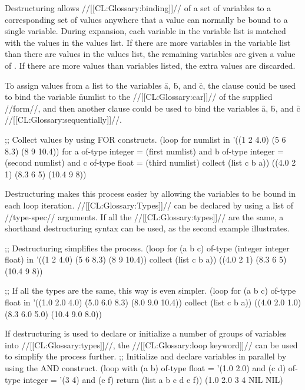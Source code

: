 \endlist
 
Destructuring allows //[[CL:Glossary:binding]]// of a set of variables to a corresponding
set of values anywhere that a value can normally be bound to a single
variable.  During  expansion, 
each variable in the variable list
is matched with the values in the values list.  If there are more variables
in the variable list than there are values in the values list, the 
remaining variables are given a value of \nil.  If there are more
values than variables listed, the extra values are discarded.

 
To assign values from a list to the variables \f{a},
\f{b}, and \f{c}, the  clause could be used to
bind the variable \f{numlist} to the 
//[[CL:Glossary:car]]// of the supplied //form//,
and then another  clause could be used to bind the variables
\f{a}, \f{b}, and \f{c} //[[CL:Glossary:sequentially]]//.  

\code
;; Collect values by using FOR constructs.
 (loop for numlist in '((1 2 4.0) (5 6 8.3) (8 9 10.4))
       for a of-type integer = (first numlist)
       and b of-type integer = (second numlist)
       and c of-type float = (third numlist)
       collect (list c b a))
\EV ((4.0 2 1) (8.3 6 5) (10.4 9 8))
\endcode

 
Destructuring makes this process easier by allowing the variables to
be bound in each loop iteration.  
//[[CL:Glossary:Types]]// can be declared by using a 
list of //type-spec// arguments.  If 
all the //[[CL:Glossary:types]]//
are the same, a shorthand destructuring syntax can be used, as the second
example illustrates.

\code
;; Destructuring simplifies the process.
 (loop for (a b c) of-type (integer integer float) in
       '((1 2 4.0) (5 6 8.3) (8 9 10.4))
       collect (list c b a))
\EV ((4.0 2 1) (8.3 6 5) (10.4 9 8))
 

;; If all the types are the same, this way is even simpler.
 (loop for (a b c) of-type float in
       '((1.0 2.0 4.0) (5.0 6.0 8.3) (8.0 9.0 10.4))
       collect (list c b a))
\EV ((4.0 2.0 1.0) (8.3 6.0 5.0) (10.4 9.0 8.0))
\endcode
 
 
 
If destructuring is used to declare or initialize a number of groups
of variables into //[[CL:Glossary:types]]//, the //[[CL:Glossary:loop keyword]]//  can be used
to simplify the process further.
\code
;; Initialize and declare variables in parallel by using the AND construct.\kern-7pt
 (loop with (a b) of-type float = '(1.0 2.0)
       and (c d) of-type integer = '(3 4)
       and (e f)
       return (list a b c d e f))
\EV (1.0 2.0 3 4 NIL NIL)
\endcode


